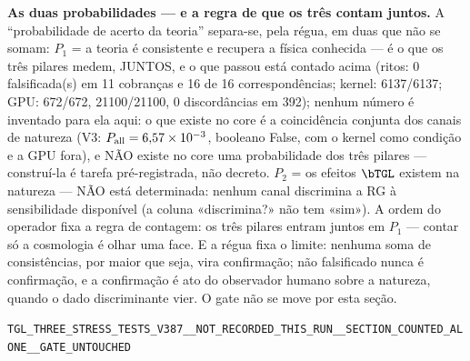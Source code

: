 \textbf{As duas probabilidades --- e a regra de que os três contam juntos.} A ``probabilidade de acerto da teoria'' separa-se, pela régua, em duas que não se somam: $P_1$ = a teoria é consistente e recupera a física conhecida --- é o que os três pilares medem, JUNTOS, e o que passou está contado acima (ritos: 0 falsificada(s) em 11 cobranças e 16 de 16 correspondências; kernel: 6137/6137; GPU: 672/672, 21100/21100, 0 discordâncias em 392); nenhum número é inventado para ela aqui: o que existe no core é a coincidência conjunta dos canais de natureza (V3: $P_{\rm all}=6{,}57\times10^{-3}$, booleano False, com o kernel como condição e a GPU fora), e NÃO existe no core uma probabilidade dos três pilares --- construí-la é tarefa pré-registrada, não decreto. $P_2$ = os efeitos $\bTGL$ existem na natureza --- NÃO está determinada: nenhum canal discrimina a RG à sensibilidade disponível (a coluna «discrimina?» não tem «sim»). A ordem do operador fixa a regra de contagem: os três pilares entram juntos em $P_1$ --- contar só a cosmologia é olhar uma face. E a régua fixa o limite: nenhuma soma de consistências, por maior que seja, vira confirmação; não falsificado nunca é confirmação, e a confirmação é ato do observador humano sobre a natureza, quando o dado discriminante vier. O gate não se move por esta seção.

\begin{center}\small\texttt{TGL\_THREE\_STRESS\_TESTS\_V387\_\_NOT\_RECORDED\_THIS\_RUN\_\_SECTION\_COUNTED\_ALONE\_\_GATE\_UNTOUCHED}\end{center}